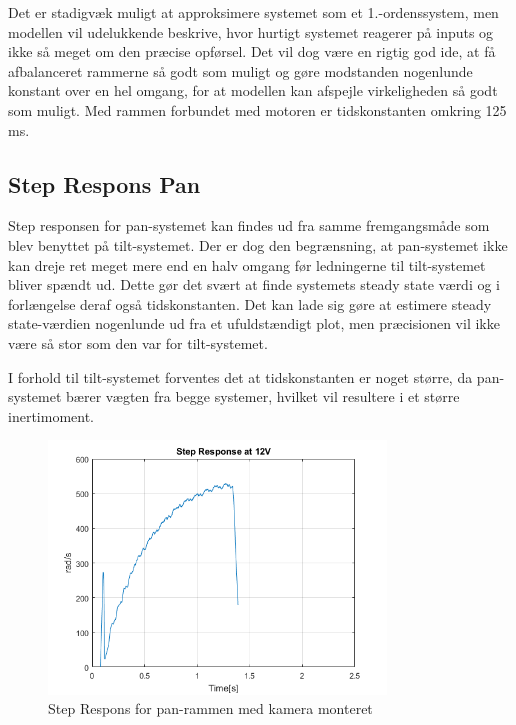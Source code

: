 Det er stadigvæk muligt at approksimere systemet som et 1.-ordenssystem, men modellen vil udelukkende beskrive, hvor hurtigt systemet reagerer på inputs og ikke så meget om den præcise opførsel. Det vil dog være en rigtig god ide, at få afbalanceret rammerne så godt som muligt og gøre modstanden nogenlunde konstant over en hel omgang, for at modellen kan afspejle virkeligheden så godt som muligt. Med rammen forbundet med motoren er tidskonstanten omkring 125 ms.

\subsection{Step Respons Pan}\label{sec:Pan_Response}

Step responsen for pan-systemet kan findes ud fra samme fremgangsmåde som blev benyttet på tilt-systemet. Der er dog den begrænsning, at pan-systemet ikke kan dreje ret meget mere end en halv omgang før ledningerne til tilt-systemet bliver spændt ud. Dette gør det svært at finde systemets steady state værdi og i forlængelse deraf også tidskonstanten. Det kan lade sig gøre at estimere steady state-værdien nogenlunde ud fra et ufuldstændigt plot, men præcisionen vil ikke være så stor som den var for tilt-systemet. 

I forhold til tilt-systemet forventes det at tidskonstanten er noget større, da pan-systemet bærer vægten fra begge systemer, hvilket vil resultere i et større inertimoment. 

\begin{figure}[!ht]
	\begin{center}
		\includegraphics[width=0.8\textwidth]{Billeder/Pan_Response.png}
	\end{center}
	\caption{Step Respons for pan-rammen med kamera monteret}
	\label{fig:Pan_Response}
\end{figure}

